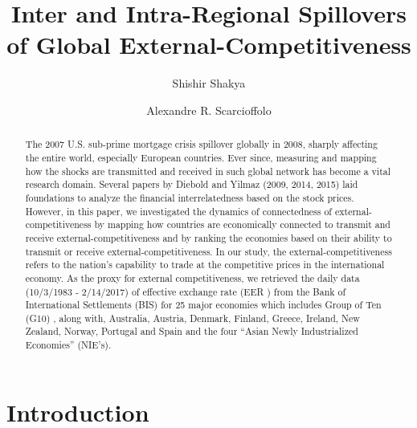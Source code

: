 \documentclass[]{elsarticle} %
\begin{document}
\begin{frontmatter}

  \title{Inter and Intra-Regional Spillovers of Global External-Competitiveness}
    \author[West Virginia University]{Shishir Shakya}
    \author[West Virginia University]{Alexandre R. Scarcioffolo}
  
      \address[West Virginia University]{College of Business and Economics \& Regional Research Institute (RRI),
West Virginia University}
    \address[Another University]{Davis College of Agriculture, Natural Resources and Design \& Regional
Research Institute (RRI), West Virginia University}
  
  \begin{abstract}
  The 2007 U.S. sub-prime mortgage crisis spillover globally in 2008,
  sharply affecting the entire world, especially European countries. Ever
  since, measuring and mapping how the shocks are transmitted and received
  in such global network has become a vital research domain. Several
  papers by Diebold and Yilmaz (2009, 2014, 2015) laid foundations to
  analyze the financial interrelatedness based on the stock prices.
  However, in this paper, we investigated the dynamics of connectedness of
  external-competitiveness by mapping how countries are economically
  connected to transmit and receive external-competitiveness and by
  ranking the economies based on their ability to transmit or receive
  external-competitiveness. In our study, the external-competitiveness
  refers to the nation's capability to trade at the competitive prices in
  the international economy. As the proxy for external competitiveness, we
  retrieved the daily data (10/3/1983 - 2/14/2017) of effective exchange
  rate (EER ) from the Bank of International Settlements (BIS) for 25
  major economies which includes Group of Ten (G10) , along with,
  Australia, Austria, Denmark, Finland, Greece, Ireland, New Zealand,
  Norway, Portugal and Spain and the four ``Asian Newly Industrialized
  Economies'' (NIE's).
  \end{abstract}
  
 \end{frontmatter}

\section{Introduction}\label{introduction}
\end{document}
